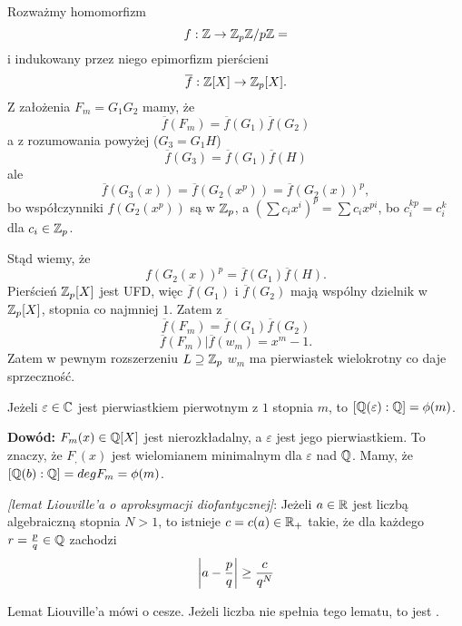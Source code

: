Rozważmy homomorfizm
$$f:\mathbb{Z}\to\mathbb{Z}_p\mathbb{Z}/p\mathbb{Z}=$$
i indukowany przez niego epimorfizm pierścieni
$$\overline f:\mathbb{Z}[X]\to\mathbb{Z}_p[X].$$
Z założenia $F_m=G_1G_2$ mamy, że
$$\overline f(F_m)=\overline f(G_1)\overline f(G_2)$$
a z rozumowania powyżej ($G_3=G_1H$)
$$\overline f(G_3)=\overline f(G_1)\overline f(H)$$
ale
$$\overline f(G_3(x))=\overline f(G_2(x^p))=\overline f(G_2(x))^p,$$
bo współczynniki $f(G_2(x^p))$ są w $\mathbb{Z}_p$, a $(\sum c_ix^i)^p=\sum c_ix^{pi}$, bo $c_i^{kp}=c_i^k$ dla $c_i\in\mathbb{Z}_p$.

Stąd wiemy, że
$$f(G_2(x))^p=\overline f(G_1)\overline f(H).$$
Pierścień $\mathbb{Z}_p[X]$ jest UFD, więc $\overline f(G_1)$ i $\overline f(G_2)$ mają wspólny dzielnik w $\mathbb{Z}_p[X]$, stopnia co najmniej $1$. Zatem z
$$\overline f(F_m)=\overline f(G_1)\overline f(G_2)$$
$$\overline f(F_m)|\overline f(w_m)=x^m-1.$$
Zatem w pewnym rozszerzeniu $L\supseteq\mathbb{Z}_p$ $w_m$ ma pierwiastek wielokrotny co daje sprzeczność.

\begin{remark}
    Jeżeli $\varepsilon\in\mathbb{C}$ jest pierwiastkiem pierwotnym z $1$ stopnia $m$, to $[\mathbb{Q}(\varepsilon):\mathbb{Q}]=\phi(m)$.
\end{remark}

\textbf{Dowód:} $F_m(x)\in\mathbb{Q}[X]$ jest nierozkładalny, a $\varepsilon$ jest jego pierwiastkiem. To znaczy, że $F_,(x)$ jest wielomianem minimalnym dla $\varepsilon$ nad $\mathbb{Q}$. Mamy, że $[\mathbb{Q}(b):\mathbb{Q}]=deg F_m=\phi(m)$.

\begin{lemma} \emph{[lemat Liouville'a o aproksymacji diofantycznej]}: Jeżeli $a\in\mathbb{R}$ jest liczbą algebraiczną stopnia $N>1$, to istnieje $c=c(a)\in\mathbb{R}_+$ takie, że dla każdego $r=\frac pq\in\mathbb{Q}$ zachodzi
    $$\left|a-\frac pq\right|\geq{c\over q^N}$$
\end{lemma}

Lemat Liouville'a mówi o cesze. Jeżeli liczba nie spełnia tego lematu, to jest .

